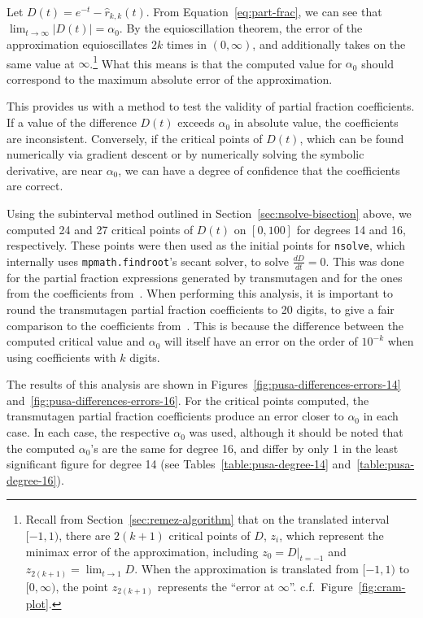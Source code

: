 Let $D(t) = e^{-t} - \hat{r}_{k,k}(t)$. From Equation~\ref{eq:part-frac}, we can see that
$\lim_{t\to\infty}{\left|D(t) \right|} = \alpha_0$. By the
equioscillation theorem, the error of the approximation equioscillates $2k$
times in $(0, \infty)$, and additionally takes on the same value at
$\infty$.\footnote{Recall from Section~\ref{sec:remez-algorithm} that on the
  translated interval $[-1, 1)$, there are $2(k+1)$ critical points of $D$,
  $z_i$, which represent the minimax error of the approximation, including
  $z_0 = D|_{t=-1}$ and $z_{2(k+1)}=\lim_{t\to 1}{D}$. When the approximation
  is translated from $[-1, 1)$ to $[0, \infty)$, the point $z_{2(k + 1)}$
  represents the ``error at $\infty$''. c.f.\ Figure~\ref{fig:cram-plot}.}
What this means is that the computed value for $\alpha_0$ should correspond to
the maximum absolute error of the approximation.

This provides us with a method to test the validity of partial fraction
coefficients. If a value of the difference $D(t)$ exceeds $\alpha_0$ in
absolute value, the coefficients are inconsistent. Conversely, if the critical
points of $D(t)$, which can be found numerically via gradient descent or by
numerically solving the symbolic derivative, are near $\alpha_0$, we can have
a degree of confidence that the coefficients are correct.

Using the subinterval method outlined in Section~\ref{sec:nsolve-bisection}
above, we computed 24 and 27 critical points of $D(t)$ on $[0, 100]$ for degrees
14 and 16, respectively. These points were then used as the initial points for
\texttt{nsolve}, which internally uses \texttt{mpmath.findroot}'s secant
solver, to solve $\frac{dD}{dt}=0$. This was done for the partial fraction
expressions generated by transmutagen and for the ones from the coefficients
from~\cite{pusa2012correction}.  When performing this analysis, it is
important to round the transmutagen partial fraction coefficients to 20
digits, to give a fair comparison to the coefficients
from~\cite{pusa2012correction}. This is because the difference between the
computed critical value and $\alpha_0$ will itself have an error on the order
of $10^{-k}$ when using coefficients with $k$ digits.

The results of this analysis are shown in
Figures~\ref{fig:pusa-differences-errors-14}
and~\ref{fig:pusa-differences-errors-16}. For the critical points computed,
the transmutagen partial fraction coefficients produce an error closer to
$\alpha_0$ in each case. In each case, the respective $\alpha_0$ was used,
although it should be noted that the computed $\alpha_0$'s are the
same for degree 16, and differ by only 1 in the least significant figure for
degree 14 (see Tables~\ref{table:pusa-degree-14} and~\ref{table:pusa-degree-16}).

